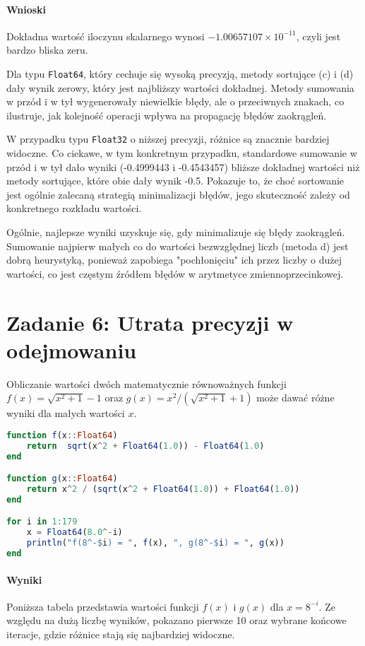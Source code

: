 \documentclass[a4paper,12pt]{article}
\begin{document}
\paragraph{Wnioski}
Dokładna wartość iloczynu skalarnego wynosi $-1.00657107 \times 10^{-11}$, czyli jest bardzo bliska zeru.

Dla typu \texttt{Float64}, który cechuje się wysoką precyzją, metody sortujące (c) i (d) dały wynik zerowy, który jest najbliższy wartości dokładnej. Metody sumowania w przód i w tył wygenerowały niewielkie błędy, ale o przeciwnych znakach, co ilustruje, jak kolejność operacji wpływa na propagację błędów zaokrągleń.

W przypadku typu \texttt{Float32} o niższej precyzji, różnice są znacznie bardziej widoczne. Co ciekawe, w tym konkretnym przypadku, standardowe sumowanie w przód i w tył dało wyniki (-0.4999443 i -0.4543457) bliższe dokładnej wartości niż metody sortujące, które obie dały wynik -0.5. Pokazuje to, że choć sortowanie jest ogólnie zalecaną strategią minimalizacji błędów, jego skuteczność zależy od konkretnego rozkładu wartości.

Ogólnie, najlepsze wyniki uzyskuje się, gdy minimalizuje się błędy zaokrągleń. Sumowanie najpierw małych co do wartości bezwzględnej liczb (metoda d) jest dobrą heurystyką, ponieważ zapobiega "pochłonięciu" ich przez liczby o dużej wartości, co jest częstym źródłem błędów w arytmetyce zmiennoprzecinkowej.

\section{Zadanie 6: Utrata precyzji w odejmowaniu}

Obliczanie wartości dwóch matematycznie równoważnych funkcji $f(x) = \sqrt{x^2 + 1} - 1$ oraz $g(x) = x^2 / (\sqrt{x^2 + 1} + 1)$ może dawać różne wyniki dla małych wartości $x$.

\begin{lstlisting}[language=Julia]
function f(x::Float64)
    return  sqrt(x^2 + Float64(1.0)) - Float64(1.0)
end

function g(x::Float64)
    return x^2 / (sqrt(x^2 + Float64(1.0)) + Float64(1.0))
end

for i in 1:179
    x = Float64(8.0^-i)
    println("f(8^-$i) = ", f(x), ", g(8^-$i) = ", g(x))
end
\end{lstlisting}

\paragraph{Wyniki}
Poniższa tabela przedstawia wartości funkcji $f(x)$ i $g(x)$ dla $x = 8^{-i}$. Ze względu na dużą liczbę wyników, pokazano pierwsze 10 oraz wybrane końcowe iteracje, gdzie różnice stają się najbardziej widoczne.
\end{document}
